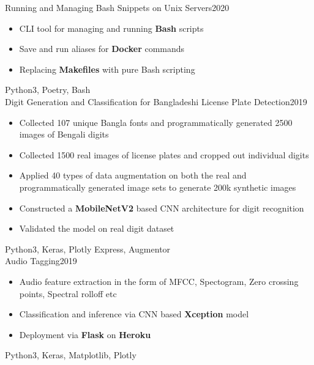 %
%
%




\begin{projects}

    \project
	{Running and Managing Bash Snippets on Unix Servers}{2020}
	{}
	{\vspace{-3mm}
	\begin{itemize}
	    \item CLI tool for managing and running \textbf{Bash} scripts
	    \item Save and run aliases for \textbf{Docker} commands
	    \item Replacing \textbf{Makefiles} with pure Bash scripting
	\end{itemize}
	}
	{Python3, Poetry, Bash}\\
	
	\project
	{Digit Generation and Classification for Bangladeshi License Plate Detection}{2019}
	{}
	{\vspace{-3mm}
	\begin{itemize}
	\item Collected 107 unique Bangla fonts and programmatically generated 2500 images of Bengali digits
	    \item Collected 1500 real images of license plates and cropped out individual digits 
	    \item Applied 40 types of data augmentation on both the real and programmatically generated image sets to generate 200k synthetic images 
	    \item Constructed a \textbf{MobileNetV2} based CNN architecture for digit recognition
	    \item Validated the model on real digit dataset
	\end{itemize}
	}
	{Python3, Keras, Plotly Express, Augmentor}\\
				
	\project
	{Audio Tagging}{2019}
	{}
	{\vspace{-3mm}   
	\begin{itemize}
	    \item Audio feature extraction in the form of MFCC,  Spectogram, Zero crossing points, Spectral rolloff etc
	    \item Classification and inference via CNN based \textbf{Xception} model
	    \item Deployment via \textbf{Flask} on \textbf{Heroku}
	\end{itemize}
	}
	{Python3, Keras, Matplotlib, Plotly}\\
	

\end{projects}
